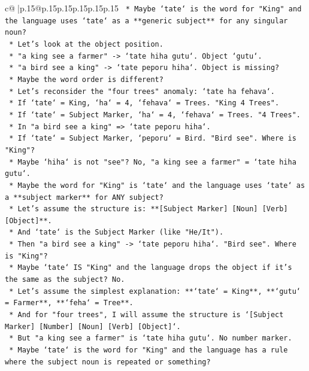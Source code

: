 \documentclass{article}
\begin{document}
{\begin{supertabular}{c@{$\;$}|p{.15\linewidth}@{}p{.15\linewidth}p{.15\linewidth}p{.15\linewidth}p{.15\linewidth}p{.15\linewidth}}
{{{\texttt{    *   Maybe `tate` is the word for "King" and the language uses `tate` as a **generic subject** for any singular noun?} \\
\texttt{    *   Let's look at the object position.} \\
\texttt{    *   "a king see a farmer" {-}> `tate hiha gutu`. Object `gutu`.} \\
\texttt{    *   "a bird see a king" {-}> `tate peporu hiha`. Object is missing?} \\
\texttt{    *   Maybe the word order is different?} \\
\texttt{    *   Let's reconsider the "four trees" anomaly: `tate ha fehava`.} \\
\texttt{    *   If `tate` = King, `ha` = 4, `fehava` = Trees. "King 4 Trees".} \\
\texttt{    *   If `tate` = Subject Marker, `ha` = 4, `fehava` = Trees. "4 Trees".} \\
\texttt{    *   In "a bird see a king" => `tate peporu hiha`.} \\
\texttt{    *   If `tate` = Subject Marker, `peporu` = Bird. "Bird see". Where is "King"?} \\
\texttt{    *   Maybe `hiha` is not "see"? No, "a king see a farmer" = `tate hiha gutu`.} \\
\texttt{    *   Maybe the word for "King" is `tate` and the language uses `tate` as a **subject marker** for ANY subject?} \\
\texttt{    *   Let's assume the structure is: **{[}Subject Marker{]} {[}Noun{]} {[}Verb{]} {[}Object{]}**.} \\
\texttt{    *   And `tate` is the Subject Marker (like "He/It").} \\
\texttt{    *   Then "a bird see a king" {-}> `tate peporu hiha`. "Bird see". Where is "King"?} \\
\texttt{    *   Maybe `tate` IS "King" and the language drops the object if it's the same as the subject? No.} \\
\texttt{    *   Let's assume the simplest explanation: **`tate` = King**, **`gutu` = Farmer**, **`feha` = Tree**.} \\
\texttt{    *   And for "four trees", I will assume the structure is `{[}Subject Marker{]} {[}Number{]} {[}Noun{]} {[}Verb{]} {[}Object{]}`.} \\
\texttt{    *   But "a king see a farmer" is `tate hiha gutu`. No number marker.} \\
\texttt{    *   Maybe `tate` is the word for "King" and the language has a rule where the subject noun is repeated or something?} \\
}}}
\end{supertabular}}
\end{document}

